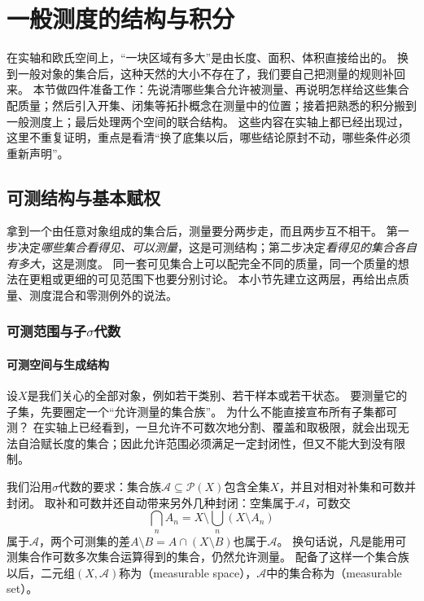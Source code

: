 \section{一般测度的结构与积分}
\label{sec:measure-general-structure}

在实轴和欧氏空间上，“一块区域有多大”是由长度、面积、体积直接给出的。
换到一般对象的集合后，这种天然的大小不存在了，我们要自己把测量的规则补回来。
本节做四件准备工作：先说清哪些集合允许被测量、再说明怎样给这些集合配质量；然后引入开集、闭集等拓扑概念在测量中的位置；接着把熟悉的积分搬到一般测度上；最后处理两个空间的联合结构。
这些内容在实轴上都已经出现过，这里不重复证明，重点是看清“换了底集以后，哪些结论原封不动，哪些条件必须重新声明”。

\subsection{可测结构与基本赋权}

拿到一个由任意对象组成的集合后，测量要分两步走，而且两步互不相干。
第一步决定\emph{哪些集合看得见、可以测量}，这是可测结构；第二步决定\emph{看得见的集合各自有多大}，这是测度。
同一套可见集合上可以配完全不同的质量，同一个质量的想法在更粗或更细的可见范围下也要分别讨论。
本小节先建立这两层，再给出点质量、测度混合和零测例外的说法。

\subsubsection{可测范围与子$\sigma$代数}

\paragraph{可测空间与生成结构}

设$X$是我们关心的全部对象，例如若干类别、若干样本或若干状态。
要测量它的子集，先要圈定一个“允许测量的集合族”。
为什么不能直接宣布所有子集都可测？
在实轴上已经看到，一旦允许不可数次地分割、覆盖和取极限，就会出现无法自洽赋长度的集合；因此允许范围必须满足一定封闭性，但又不能大到没有限制。

我们沿用$\sigma$代数的要求：集合族$\mathcal A\subseteq\mathcal P(X)$包含全集$X$，并且对相对补集和可数并封闭。
取补和可数并还自动带来另外几种封闭：空集属于$\mathcal A$，可数交
\[
 \bigcap_nA_n=X\setminus\bigcup_n(X\setminus A_n)
\]
属于$\mathcal A$，两个可测集的差$A\setminus B=A\cap(X\setminus B)$也属于$\mathcal A$。
换句话说，凡是能用可测集合作可数多次集合运算得到的集合，仍然允许测量。
配备了这样一个集合族以后，二元组$(X,\mathcal A)$称为（measurable space），$\mathcal A$中的集合称为（measurable set）。

